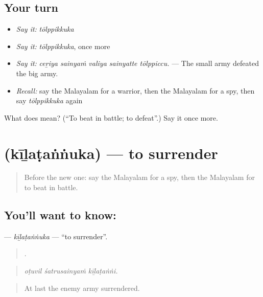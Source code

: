 \subsection*{Your turn}
\begin{itemize}
\raggedright
  \item \emph{Say it:} \emph{tōlppikkuka}
  \item \emph{Say it:} \emph{tōlppikkuka}, once more
  \item \emph{Say it:} \emph{ceṟiya sainyaṁ valiya sainyatte tōlppiccu.} — The small army defeated the big army.
  \item \emph{Recall:} say the Malayalam for a warrior, then the Malayalam for a spy, then say \emph{tōlppikkuka} again
\end{itemize}

\begin{tcolorbox}[breakable,colback=teal!4,colframe=teal!35!black,title={Before you move on}]
What does  mean? (\textquotedblleft{}To beat in battle; to defeat\textquotedblright{}.) Say it once more.
\end{tcolorbox}
\section[\texorpdfstring{\ml{കീഴടങ്ങുക} (kīḻaṭaṅṅuka)}{കീഴടങ്ങുക (kīḻaṭaṅṅuka)}]{ (kīḻaṭaṅṅuka) — to surrender}

\label{lesson:ML-C400-kilatannuka}



\begin{quote}
Before the new one: say the Malayalam for a spy, then the Malayalam for to beat in battle.
\end{quote}

\subsection*{You'll want to know: }
\textbf{} — \emph{kīḻaṭaṅṅuka} — \textquotedblleft{}to surrender\textquotedblright{}.

\begin{quote}
  .
\end{quote}

\begin{quote}
\emph{oṭuvil śatrusainyaṁ kīḻaṭaṅṅi.}
\end{quote}

\begin{quote}
At last the enemy army surrendered.
\end{quote}


